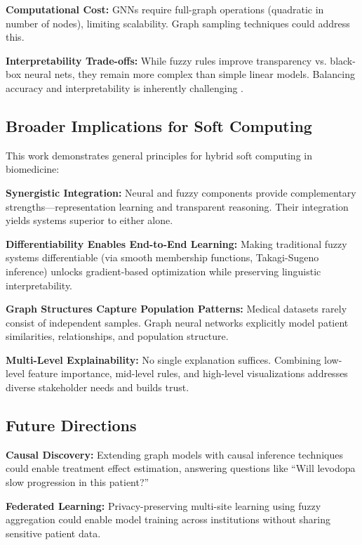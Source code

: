 \documentclass[conference]{IEEEtran}
\begin{document}
\textbf{Computational Cost:} GNNs require full-graph operations (quadratic in number of nodes), limiting scalability. Graph sampling techniques \cite{hamilton2017inductive} could address this.

\textbf{Interpretability Trade-offs:} While fuzzy rules improve transparency vs. black-box neural nets, they remain more complex than simple linear models. Balancing accuracy and interpretability is inherently challenging \cite{rudin2019stop}.

\subsection{Broader Implications for Soft Computing}

This work demonstrates general principles for hybrid soft computing in biomedicine:

\textbf{Synergistic Integration:} Neural and fuzzy components provide complementary strengths---representation learning and transparent reasoning. Their integration yields systems superior to either alone.

\textbf{Differentiability Enables End-to-End Learning:} Making traditional fuzzy systems differentiable (via smooth membership functions, Takagi-Sugeno inference) unlocks gradient-based optimization while preserving linguistic interpretability.

\textbf{Graph Structures Capture Population Patterns:} Medical datasets rarely consist of independent samples. Graph neural networks explicitly model patient similarities, relationships, and population structure.

\textbf{Multi-Level Explainability:} No single explanation suffices. Combining low-level feature importance, mid-level rules, and high-level visualizations addresses diverse stakeholder needs and builds trust.

\subsection{Future Directions}

\textbf{Causal Discovery:} Extending graph models with causal inference techniques \cite{peters2017elements} could enable treatment effect estimation, answering questions like ``Will levodopa slow progression in this patient?''

\textbf{Federated Learning:} Privacy-preserving multi-site learning using fuzzy aggregation \cite{kairouz2019advances} could enable model training across institutions without sharing sensitive patient data.
\end{document}
